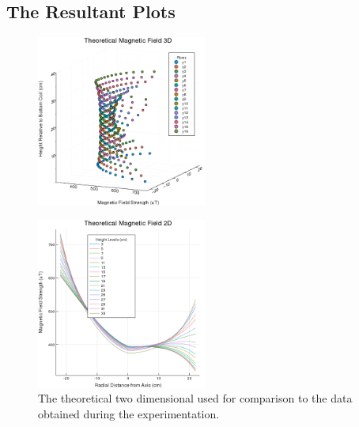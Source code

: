 \documentclass[a4paper]{article}
\begin{document}
\subsection{The Resultant Plots}

\begin{figure}[H]
\centering
\includegraphics[width=0.5\textwidth]{3DPlotTheoretical.png}


\label{Theoretical 3-D plot}
\end{figure}


\begin{figure}[H]
  \begin{center}
    \includegraphics[width=0.5\textwidth]{2DPlotTheoretical.png}
  \end{center}
  \caption{The theoretical two dimensional used for comparison to the data
    obtained during the experimentation.}
  \label{Theoretical 2-D plot}

\end{figure}
\end{document}
